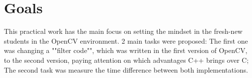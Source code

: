 \section{Goals}\label{sec:1}
This practical work has the main focus on setting the mindset in the fresh-new students in the OpenCV environment. 2 main tasks were proposed: The first one was changing a ""filter code"", which was written in the first version of OpenCV, to the second version, paying attention on which advantages C++ brings over C; The second task was measure the time difference between both implementations.    